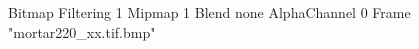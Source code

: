{Bitmap
	{Filtering 1}
	{Mipmap 1}
	{Blend none}
	{AlphaChannel 0}
	{Frame "mortar220_xx.tif.bmp"}
}
